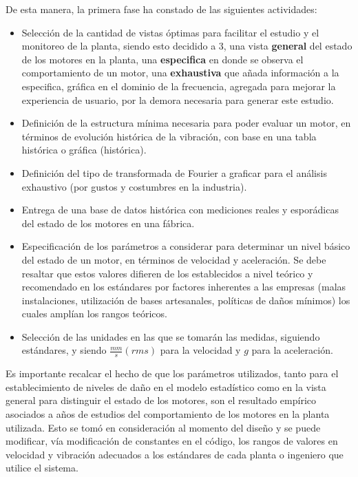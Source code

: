 De esta manera, la primera fase ha constado de las siguientes actividades:

\begin{itemize}
    \item Selección de la cantidad de vistas óptimas para facilitar el estudio
        y el monitoreo de la planta, siendo esto decidido a 3, una vista
        \textbf{general} del estado de los motores en la planta, una
        \textbf{especifica} en donde se observa el comportamiento de un motor,
        una \textbf{exhaustiva} que añada información a la especifica, gráfica en
        el dominio de la frecuencia, agregada para mejorar la experiencia de
        usuario, por la demora necesaria para generar este estudio.
    \item Definición de la estructura mínima necesaria para poder evaluar un
        motor, en términos de evolución histórica de la vibración, con base en
        una tabla histórica o gráfica (histórica).
    \item Definición del tipo de transformada de Fourier a graficar para el
        análisis exhaustivo (por gustos y costumbres en la industria).
    \item Entrega de una base de datos histórica con mediciones reales y esporádicas
        del estado de los motores en una fábrica.
    \item Especificación de los parámetros a considerar para determinar un nivel
        básico del estado de un motor, en términos de velocidad y aceleración.
        Se debe resaltar que estos valores difieren de los establecidos a nivel
        teórico y recomendado en los estándares por factores inherentes a las
        empresas (malas instalaciones,
        utilización de bases artesanales, políticas de daños mínimos) los cuales
        amplían los rangos teóricos.
    \item Selección de las unidades en las que se tomarán las medidas, siguiendo
        estándares, y siendo $\frac{mm}{s}(rms)$ para la velocidad y $g$ para la
        aceleración.
\end{itemize}

Es importante recalcar el hecho de que los parámetros utilizados, tanto
para el establecimiento de niveles de daño en el modelo estadístico como
en la vista general para distinguir el estado de los motores, son el resultado
empírico asociados a años de estudios del comportamiento de los motores en la
planta utilizada. Esto se tomó en consideración al momento del diseño y se puede
modificar, vía modificación de constantes en el código, los rangos de valores
en velocidad y vibración adecuados a los estándares de cada planta o ingeniero
que utilice el sistema.

